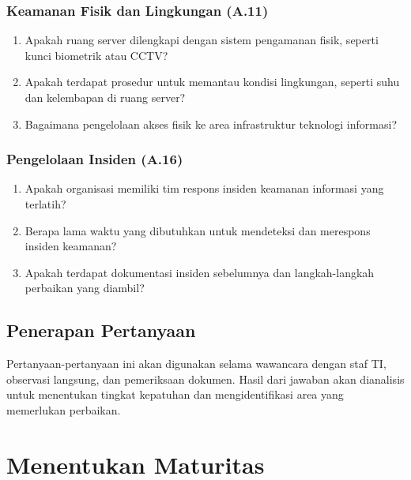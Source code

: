 \documentclass[12pt, a4paper]{report}
\begin{document}
\subsection{Keamanan Fisik dan Lingkungan (A.11)}
\begin{enumerate}
    \item Apakah ruang server dilengkapi dengan sistem pengamanan fisik, seperti kunci biometrik atau CCTV?
    \item Apakah terdapat prosedur untuk memantau kondisi lingkungan, seperti suhu dan kelembapan di ruang server?
    \item Bagaimana pengelolaan akses fisik ke area infrastruktur teknologi informasi?
\end{enumerate}

\subsection{Pengelolaan Insiden (A.16)}
\begin{enumerate}
    \item Apakah organisasi memiliki tim respons insiden keamanan informasi yang terlatih?
    \item Berapa lama waktu yang dibutuhkan untuk mendeteksi dan merespons insiden keamanan?
    \item Apakah terdapat dokumentasi insiden sebelumnya dan langkah-langkah perbaikan yang diambil?
\end{enumerate}

\section{Penerapan Pertanyaan}
Pertanyaan-pertanyaan ini akan digunakan selama wawancara dengan staf TI, observasi langsung, dan pemeriksaan dokumen. Hasil dari jawaban akan dianalisis untuk menentukan tingkat kepatuhan dan mengidentifikasi area yang memerlukan perbaikan.

\chapter{Menentukan Maturitas}
\label{bab:maturitas}
\end{document}

